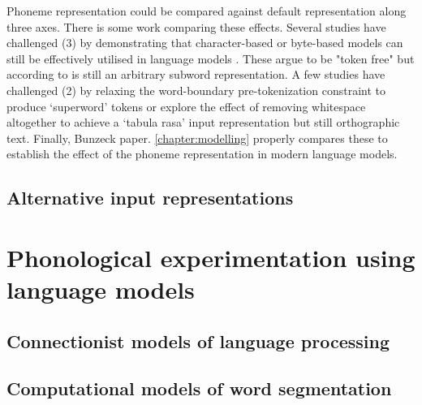Phoneme representation could be compared against default representation along three axes. There is some work comparing these effects. Several studies have challenged (3) by demonstrating that character-based or byte-based models can still be effectively utilised in language models \addcites. These argue to be "token free" but according to \addcites is still an arbitrary subword representation. A few studies have challenged (2) by relaxing the word-boundary pre-tokenization constraint to produce `superword' tokens \addcites or explore the effect of removing whitespace altogether to achieve a `tabula rasa' input representation \addcites but still orthographic text. Finally, Bunzeck paper. \cref{chapter:modelling} properly compares these to establish the effect of the phoneme representation in modern language models.

\subsection{Alternative input representations}\label{sec:12-alternatives}


\section{Phonological experimentation using language models}\label{sec:12-phoneval}


\subsection{Connectionist models of language processing}


\subsection{Computational models of word segmentation}

